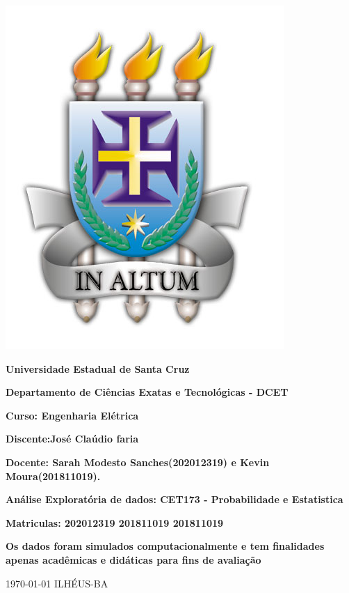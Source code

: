 \documentclass[12pt]{article}\usepackage[]{graphicx}\usepackage[]{color}
\begin{document}
\begin{center}
    \includegraphics[scale=0.2]{uesct.jpg}
    
    \textbf{Universidade Estadual de Santa Cruz}
    
    \textbf{Departamento de Ciências Exatas e Tecnológicas - DCET}

    \textbf{Curso: Engenharia Elétrica}
    
    \textbf{Discente:José Claúdio faria }
  
    \textbf{Docente: Sarah Modesto Sanches(202012319) e Kevin Moura(201811019).}
     \vspace{2cm}
     
    \Large\textbf{Análise Exploratória de dados: CET173 - Probabilidade e Estatistica}
    
    \large\textbf{Matriculas: 202012319 201811019 201811019}
    
    \large\textbf{Os dados foram simulados computacionalmente e tem finalidades apenas acadêmicas e didáticas para fins de avaliação}
   
\vfill  
    \begin{center}
        \today
        ILHÉUS-BA
    \end{center}
\end{center} 

\newpage
\end{document}
